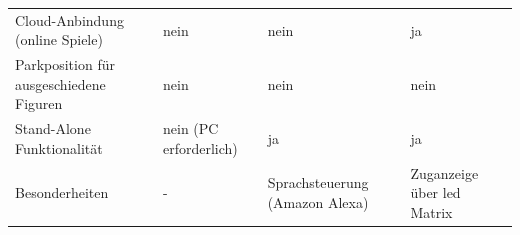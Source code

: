 \begin{longtable}[]{@{}llll@{}}
\begin{minipage}[t]{0.19\columnwidth}
Cloud-Anbindung (online Spiele)\strut
\end{minipage} & \begin{minipage}[t]{0.25\columnwidth}\raggedright
nein\strut
\end{minipage} & \begin{minipage}[t]{0.26\columnwidth}\raggedright
nein\strut
\end{minipage} & \begin{minipage}[t]{0.19\columnwidth}\raggedright
ja\strut
\end{minipage}\tabularnewline
\begin{minipage}[t]{0.19\columnwidth}\raggedright
Parkposition für ausgeschiedene Figuren\strut
\end{minipage} & \begin{minipage}[t]{0.25\columnwidth}\raggedright
nein\strut
\end{minipage} & \begin{minipage}[t]{0.26\columnwidth}\raggedright
nein\strut
\end{minipage} & \begin{minipage}[t]{0.19\columnwidth}\raggedright
nein\strut
\end{minipage}\tabularnewline
\begin{minipage}[t]{0.19\columnwidth}\raggedright
Stand-Alone Funktionalität\strut
\end{minipage} & \begin{minipage}[t]{0.25\columnwidth}\raggedright
nein (PC erforderlich)\strut
\end{minipage} & \begin{minipage}[t]{0.26\columnwidth}\raggedright
ja\strut
\end{minipage} & \begin{minipage}[t]{0.19\columnwidth}\raggedright
ja\strut
\end{minipage}\tabularnewline
\begin{minipage}[t]{0.19\columnwidth}\raggedright
Besonderheiten\strut
\end{minipage} & \begin{minipage}[t]{0.25\columnwidth}\raggedright
-\strut
\end{minipage} & \begin{minipage}[t]{0.26\columnwidth}\raggedright
Sprachsteuerung (Amazon Alexa)\strut
\end{minipage} & \begin{minipage}[t]{0.19\columnwidth}\raggedright
Zuganzeige über \gls{led} Matrix\strut
\end{minipage}\tabularnewline

\end{longtable}
